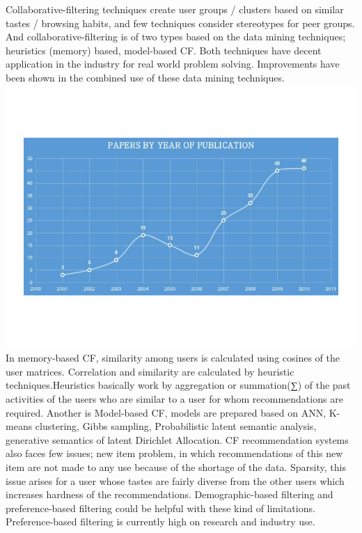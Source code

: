 \documentclass[12pt,a4paper]{article}
\begin{document}
Collaborative-filtering techniques create user groups / clusters based on similar tastes / browsing habits, and few techniques consider stereotypes for peer groups. And collaborative-filtering is of two types based on the data mining techniques; heuristics (memory) based, model-based CF. Both techniques have decent application in the industry for real world problem solving. Improvements have been shown in the combined use of these data mining techniques.\\
\includegraphics[width=\linewidth]{images/Untitled}\\
In memory-based CF, similarity among users is calculated using cosines of the user matrices. Correlation and similarity are calculated by heuristic techniques.Heuristics basically work by aggregation or summation(∑) of the past activities of the users who are similar to a user for whom recommendations are required. Another is Model-based CF, models are prepared based on ANN, K-means clustering, Gibbs sampling, Probabilistic latent semantic analysis, generative semantics of latent Dirichlet Allocation. CF recommendation systems also faces few issues; new item problem, in which recommendations of this new item are not made to any use because of the shortage of the data. Sparsity, this issue arises for a user whose tastes are fairly diverse from the other users which increases hardness of the recommendations. Demographic-based filtering and preference-based filtering could be helpful with these kind of limitations. Preference-based filtering is currently high on research and industry use.\\
\end{document}
